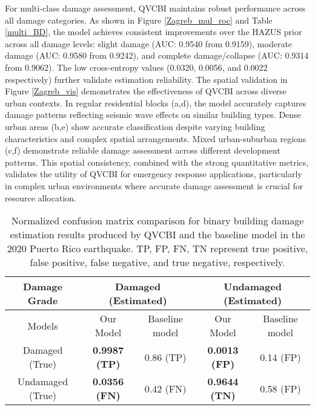 \documentclass[review]{elsarticle}
\begin{document}
For multi-class damage assessment, QVCBI maintains robust performance across all damage categories. As shown in Figure \ref{Zagreb_mul_roc} and Table \ref{multi_BD}, the model achieves consistent improvements over the HAZUS prior across all damage levels: slight damage (AUC: 0.9540 from 0.9159), moderate damage (AUC: 0.9580 from 0.9242), and complete damage/collapse (AUC: 0.9314 from 0.9062). The low cross-entropy values (0.0320, 0.0056, and 0.0022 respectively) further validate estimation reliability. The spatial validation in Figure \ref{Zagreb_vis} demonstrates the effectiveness of QVCBI across diverse urban contexts. In regular residential blocks (a,d), the model accurately captures damage patterns reflecting seismic wave effects on similar building types. Dense urban areas (b,e) show accurate classification despite varying building characteristics and complex spatial arrangements. Mixed urban-suburban regions (c,f) demonstrate reliable damage assessment across different development patterns. This spatial consistency, combined with the strong quantitative metrics, validates the utility of QVCBI for emergency response applications, particularly in complex urban environments where accurate damage assessment is crucial for resource allocation.






\begin{table*}[t]
  \caption{Normalized confusion matrix comparison for binary building damage estimation results produced by QVCBI and the baseline model\cite{rao2022earthquake} in the 2020 Puerto Rico earthquake. TP, FP, FN, TN represent true positive, false positive, false negative, and true negative, respectively.}
 \centering
 \begin{tabular}{|c|c|c|c|c|}
\toprule
Damage Grade &\multicolumn{2}{|c|}{Damaged (Estimated)
} & \multicolumn{2}{|c|}{Undamaged (Estimated)
}\\
\hline
Models & Our Model & Baseline model &  Our Model & Baseline model\\
\hline
Damaged (True) &  \textbf{0.9987 (TP)} & 0.86 (TP)& \textbf{0.0013 (FP)} & 0.14 (FP)  \\
\hline
Undamaged (True) & \textbf{0.0356 (FN)} & 0.42 (FN) & \textbf{0.9644 (TN)}  & 0.58 (FP)\\
\bottomrule
 \end{tabular}
 \label{conf_PR}
 \end{table*}
\end{document}
